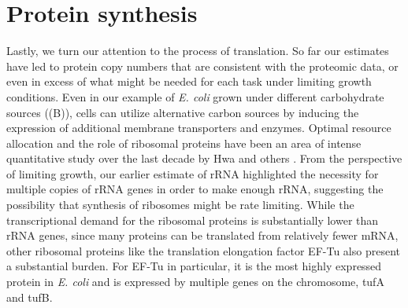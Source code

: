 \section{Protein synthesis}

Lastly, we turn our attention to the process of translation. So far our
estimates have led to protein copy numbers that are consistent with the
proteomic data, or even in excess of what might be needed for each task under
limiting growth conditions. Even in our example of \textit{E. coli} grown under
different carbohydrate sources ((B)), cells can utilize
alternative carbon sources by inducing the expression of additional membrane
transporters and enzymes. Optimal resource allocation and the role of ribosomal
proteins have been an area of intense quantitative study over the last decade by
Hwa and others \citep{scott2010, hui2015}. From the perspective of limiting
growth, our earlier estimate of rRNA highlighted the necessity for multiple
copies of rRNA genes in order to make enough rRNA, suggesting the possibility
that synthesis of ribosomes might be rate limiting. While the transcriptional
demand for  the ribosomal proteins is substantially lower than rRNA genes, since
many proteins can be translated from relatively fewer mRNA, other ribosomal
proteins like the translation elongation factor EF-Tu also present a substantial
burden. For EF-Tu  in particular, it is the most highly expressed protein in
\textit{E. coli} and  is expressed by multiple genes on the chromosome, tufA and
tufB.



